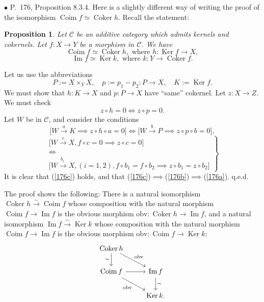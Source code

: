 \documentclass[12pt]{article}
\newtheorem{prop}[thm]{Proposition}
\theoremstyle{remark}%
\newcommand{\bu}{\bullet}
\newcommand{\n}{\noindent}
\newcommand{\C}{\mathcal C}
\newcommand{\pf}{\n{\em Proof. }}
\newcommand{\bp}{\begin{prop}}
\newcommand{\ep}{\end{prop}}
\DeclareMathOperator{\Coim}{Coim}
\DeclareMathOperator{\Coker}{Coker}
\DeclareMathOperator{\Ima}{Im}
\DeclareMathOperator{\Ker}{Ker}
\begin{document}
\n$\bu$ P.~176, Proposition 8.3.4. Here is a slightly different way of writing the proof of the isomorphism $\Coim f\simeq\Coker h$. Recall the statement: 
%
\bp 
Let $\C$ be an additive category which admits kernels and cokernels. Let $f:X\to Y$ be a morphism in $\C$. We have 
$$ 
\Coim f\simeq\Coker h,\text{ where }h:\Ker f\to X, 
$$ 
$$ 
\Ima f\simeq\Ker k,\text{ where }k:Y\to\Coker f.  
$$ 
\ep
% 
\pf Let us use the abbreviations 
$$
P:=X\times_YX,\quad p:=p_1-p_2:P\to X,\quad K:=\Ker f.
$$
We must show that $h:K\to X$ and $p:P\to X$ have ``same'' cokernel. Let $z:X\to Z$. We must check 
%
\begin{equation}\label{176a}
z\circ h=0\iff z\circ p=0.
\end{equation}
%
Let $W$ be in $\C$, and consider the conditions 
%
\begin{equation}\label{176b}
\Big[W\overset{a}{\to}K\implies z\circ h\circ a=0\Big]\iff\Big[W\overset{b}{\to}P\implies z\circ p\circ b=0\Big],
\end{equation}
%
\begin{equation}\label{176c}
\left.
\begin{matrix}
\Big[W\overset{c}{\to}X,f\circ c=0\implies z\circ c=0\Big]\\ 
\iff\\ 
\Big[W\overset{b_i\ }{\to}X,(i=1,2),f\circ b_1=f\circ b_2\implies z\circ b_1=z\circ b_2\Big]
\end{matrix}
\right\}
\end{equation}
It is clear that (\ref{176c}) holds, and that (\ref{176c})$\implies$(\ref{176b})$\implies$(\ref{176a}). q.e.d. 

The proof shows the following: There is a natural isomorphism $\Coker h\xrightarrow{\sim}\Coim f$ whose composition with the natural morphism $\Coim f\to\Ima f$ is the obvious morphism $\text{obv}:\Coker h\to\Ima f$, and a natural isomorphism $\Ima f\xrightarrow{\sim}\Ker k$ whose composition with the natural morphism $\Coim f\to\Ima f$ is the obvious morphism $\text{obv}:\Coim f\to\Ker k$: 
$$
\begin{tikzcd}
\Coker h\ar{d}[swap]{\sim}\ar{dr}{\text{obv}}\\
\Coim f\ar{r}\ar{dr}[swap]{\text{obv}}&\Ima f\ar{d}{\sim}\\
&\Ker k.
\end{tikzcd}
$$

\end{document}
